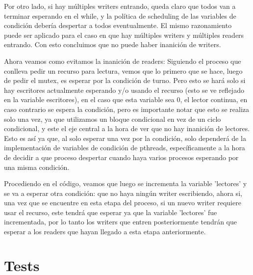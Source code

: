 \documentclass{article}
\begin{document}
Por otro lado, si hay múltiples writers entrando, queda claro que todos van a terminar esperando en el while, y la política de scheduling de las variables de condición debería despertar a todos eventualmente. El mismo razonamiento puede ser aplicado para el caso en que hay múltiples writers y múltiples readers entrando. Con esto concluimos que no puede haber inanición de writers.\par\smallbreak

Ahora veamos como evitamos la inanición de readers:
Siguiendo el proceso que conlleva pedir un recurso para lectura, vemos que lo primero que se hace, luego de pedir el mutex, es esperar por la condición de turno. Pero esto se hará solo si hay escritores actualmente esperando y/o usando el recurso (esto se ve reflejado en la variable escritores), en el caso que esta variable sea 0, el lector continua, en caso contrario se espera la condición, pero es importante notar que esto se realiza solo una vez, ya que utilizamos un bloque condicional en vez de un ciclo condicional, y este el eje central a la hora de ver que no hay inanición de lectores.
Esto es así ya que, al solo esperar una vez por la condición, solo dependerá de la implementación de variables de condición de pthreads, específicamente a la hora de decidir a que proceso despertar cuando haya varios procesos esperando por una misma condición.\par\smallbreak
Procediendo en el código, veamos que luego se incrementa la variable 'lectores' y se va a esperar otra condición: que no haya ningún writer escribiendo, ahora si, una vez que se encuentre en esta etapa del proceso, si un nuevo writer requiere usar el recurso, este tendrá que esperar ya que la variable 'lectores' fue incrementada, por lo tanto los writers que entren posteriormente tendrán que esperar a los readers que hayan llegado a esta etapa anteriormente. 

\section{Tests}
\end{document}
